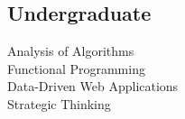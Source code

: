 \documentclass[]{deedy-resume-openfont}
\begin{document}
\begin{minipage}[t]{0.33\textwidth}
\subsection{Undergraduate}
Analysis of Algorithms \\
Functional Programming \\
Data-Driven Web Applications \\
Strategic Thinking\\


\sectionsep



%
%


\end{minipage}
\end{document}

